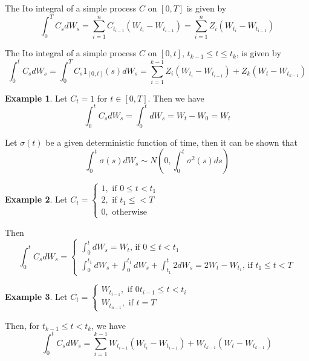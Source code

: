 \documentclass[11pt,a4paper]{book}
\theoremstyle{definition}\newtheorem{definition}{Definition}
\theoremstyle{definition}\newtheorem{fact}{Fact}
\theoremstyle{definition}\newtheorem{remark}{Remark}
\theoremstyle{definition}\newtheorem{ex}{Ex.}
\theoremstyle{definition}\newtheorem{project}{Project}
\theoremstyle{definition}\newtheorem{problem}{Problem}
\theoremstyle{definition}\newtheorem{example}{Example}
\numberwithin{theorem}{section}
\numberwithin{corollary}{chapter}
\numberwithin{assumption}{chapter}
\numberwithin{definition}{chapter}
\numberwithin{prop}{chapter}
\numberwithin{notation}{chapter}
\numberwithin{problem}{chapter}
\numberwithin{example}{chapter}
\numberwithin{fact}{chapter}
\numberwithin{ex}{chapter}
\begin{document}
The Ito integral of a simple process $C$ on $[0, T]$ is given by
\begin{equation}
\int_0^T C_s dW_s = \sum_{i=1}^n C_{t_{i-1}} (W_{t_i} - W_{t_{i-1}}) = \sum_{i=1}^n Z_i (W_{t_i} - W_{t_{i-1}})
\end{equation}

The Ito integral of a simple process $C$ on $[0,t]$, $t_{k-1} \leq t \leq t_k$, is given by
\begin{equation}
\int_0^t C_s dW_s = \int_0^T C_s 1_{[0,t]}(s) dW_s = \sum_{i=1}^{k-1} Z_i (W_{t_i} - W_{t_{i-1}}) + Z_k (W_t - W_{t_{k-1}})
\end{equation}

\begin{example}
Let $C_t = 1$ for $t \in [0,T]$. Then we have
\begin{equation}
\int_0^t C_s dW_s = \int_0^t dW_s = W_t - W_0 = W_t
\end{equation}
\end{example}

Let $\sigma(t)$ be a given deterministic function of time, then it can be shown that
$$ \int_0^t \sigma(s) dW_s \sim N \left(0, \int_0^t \sigma^2(s) ds \right) $$

\begin{example}
Let $C_t = \begin{cases}
1, \text{   if } 0 \leq t < t_1 \\
2, \text{   if } t_1 \leq < T \\
0, \text{   otherwise}
\end{cases}$

Then
$$ \int_0^t C_s dW_s = \begin{cases}
\int_0^t dW_s = W_t \text{,   if } 0 \leq t < t_1 \\
\int_0^{t_1} dW_s + \int_0^{t_1} dW_s + \int_{t_1}^t 2dW_s = 2W_t - W_{t_1} \text{,   if } t_1 \leq t < T
\end{cases} $$
\end{example}

\begin{example}
Let $C_t = \begin{cases}
W_{t_{i-1}}, \text{   if } 0t_{i-1}\leq t < t_i \\
W_{t_{n-1}}, \text{   if } t = T
\end{cases}$

Then, for $t_{k-1} \leq t < t_k$, we have
$$ \int_0^t C_s dW_s = \sum_{i=1}^{k-1} W_{t_{i-1}} (W_{t_i} - W_{t_{i-1}}) + W_{t_{k-1}} (W_t - W_{t_{k-1}}) $$
\end{example}
\end{document}
